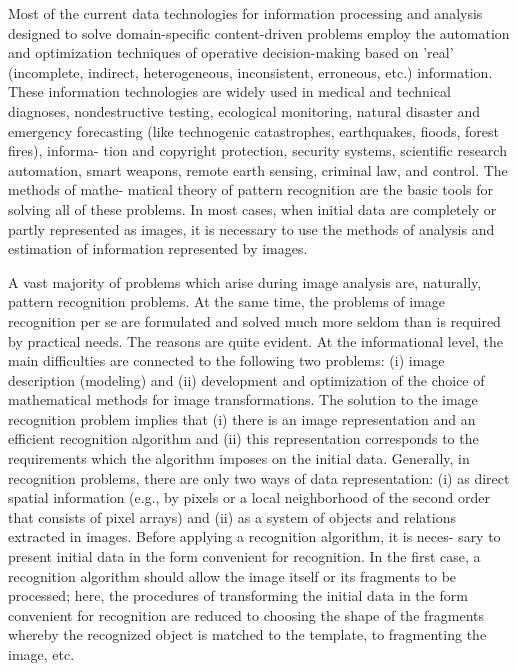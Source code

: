 Most of the current data technologies for information processing and analysis designed 
to solve domain-specific content-driven problems employ the automation and optimization 
techniques of operative decision-making based on 'real' (incomplete, indirect, heterogeneous,
inconsistent, erroneous, etc.) information. These information technologies are widely 
used in medical and technical diagnoses, nondestructive testing, ecological monitoring,
natural disaster and emergency forecasting (like technogenic catastrophes, earthquakes, 
fioods, forest fires), informa- tion and copyright protection, security systems, 
scientific research automation, smart weapons, remote earth sensing, criminal law, 
and control. The methods of mathe- matical theory of pattern recognition are the basic 
tools for solving all of these problems. In most cases, when initial data are completely 
or partly represented as images, it is necessary to use the methods of analysis and 
estimation of information represented by images. 

A vast majority of problems which arise 
during image analysis are, naturally, pattern recognition problems. At the same time, 
the problems of image recognition  per se  are formulated and solved much more seldom 
than is required by practical needs. The reasons are quite evident. At the informational 
level, the main difficulties are connected to the following two problems: 
(i) image description (modeling) and (ii) development and optimization of the choice of 
mathematical methods for image transformations. The solution to the image recognition 
problem implies that (i) there is an image representation and an efficient recognition 
algorithm and (ii) this representation corresponds to the requirements which the 
algorithm imposes on the initial data. Generally, in recognition problems, 
there are only two ways of data representation: (i) as direct spatial information 
(e.g., by pixels or a local neighborhood of the second order that consists of pixel 
arrays) and (ii) as a system of objects and relations extracted in images. 
Before applying a recognition algorithm, it is neces- sary to present initial 
data in the form convenient for recognition. In the first case, a recognition 
algorithm should allow the image itself or its fragments to be processed; here, 
the procedures of transforming the initial data in the form convenient for recognition 
are reduced to choosing the shape of the fragments whereby the recognized object 
is matched to the template, to fragmenting the image, etc.

